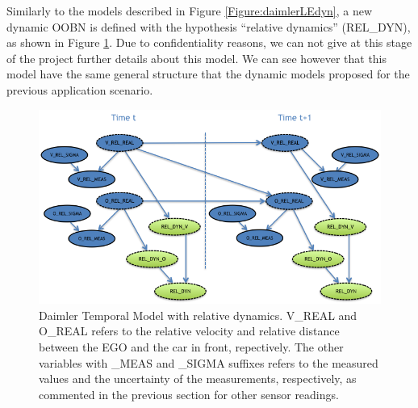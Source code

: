 Similarly to the models described in Figure \ref{Figure:daimlerLEdyn},  a new dynamic OOBN is defined with the hypothesis ``relative dynamics'' (REL\_DYN), as shown in Figure \ref{Figure:daimlerreldyn}. Due to confidentiality reasons, we can not give at this stage of the project further details about this model. We can see however that this model have the same general structure that the dynamic models proposed for the previous application scenario. 


 

\begin{figure}
\begin{center}
\includegraphics[scale=0.58]{./figures/Daimlerreldyn.png}
\end{center}
\caption{\label{Figure:daimlerreldyn}Daimler Temporal Model with relative dynamics. V\_REAL and O\_REAL refers to the relative velocity and relative distance between the EGO and the car in front, repectively. The other variables with \_MEAS and \_SIGMA suffixes refers to the measured values and the uncertainty of the measurements, respectively, as commented in the previous section for other sensor readings.}
\end{figure}


%
%
%



